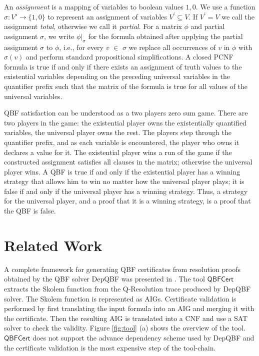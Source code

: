 \documentclass[runningheads]{llncs}
\newcommand{\qrpcert}{\mathsf{QBFCert}}
\newcommand{\matrixf}{\phi}
\newcommand{\qp}{\mathcal{Q}}
\newcommand{\0}{0}
\newcommand{\1}{1}
\begin{document}
An \textit{assignment} is a mapping of variables to boolean values $\1, \0$. We use a function $\sigma \colon V' \to \{\1, \0 \}$ to represent an assignment of variables $V^{\prime} \subseteq V$. If $V^{\prime} = V$ we call the assignment \emph{total}, otherwise we call it \emph{partial}. For a matrix $\matrixf$ and partial assignment $\sigma$, we write $\matrixf|_{\sigma}$ for the formula obtained after applying the partial assignment $\sigma$ to $\matrixf$, i.e., for every $v$ $\in$ $\sigma$ we replace all occurrences of $v$ in $\phi$ with $\sigma(v)$ and perform standard propositional simplifications.
A closed PCNF formula is true if and only if there exists an assignment of truth values to the existential variables depending on the preceding universal variables in the quantifier prefix such that the matrix of the formula is true for all values of the universal variables.
%

QBF satisfaction can be understood as a two players zero sum game. There are two players in the game: the existential player
owns the existentially quantified variables, the universal player owns the rest. The players step through the quantifier prefix, and as each variable is encountered, the player who owns it declares a value for it. The existential player wins a run of the game if the constructed assignment satisfies all clauses in the matrix; otherwise the universal player wins. A QBF is true if and only if the existential player has a winning strategy that allows him to win no matter how the universal player plays; it is false if and only if the universal player has a winning strategy. Thus, a strategy for the universal player, and a proof that it is a winning strategy, is a proof that the QBF is false.

\section{Related Work} \label{sec:related-work}

A complete framework for generating QBF certificates from resolution proofs obtained by the QBF solver DepQBF was presented in \cite{NiemetzPLSB12}. The tool $\qrpcert$ extracts the Skolem function \cite{BalabanovJ11} from the Q-Resolution trace produced by DepQBF solver. The Skolem function is represented as AIGs. Certificate validation is performed by first translating the input formula into an AIG  and merging it with the certificate. Then the resulting AIG is translated into a CNF and use a SAT solver to check the validity. Figure \ref{fig:tool} (a) shows the overview of the tool. $\qrpcert$ does not support the advance dependency scheme used by DepQBF and the certificate validation is the most expensive step of the tool-chain.  
 
\end{document}
